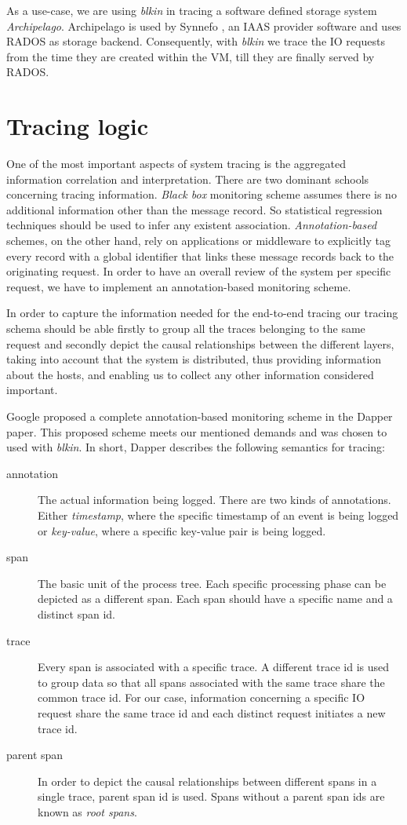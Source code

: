 \documentclass[a4paper,10pt,twocolumn]{article}
\begin{document}
As a use-case, we are using \emph{blkin} in tracing a software defined storage
system \emph{Archipelago}\cite{archip}. Archipelago is used by Synnefo
\cite{synnefo}, an IAAS provider software and uses RADOS\cite{rados} as storage
backend. Consequently, with \emph{blkin} we trace the IO requests from the time
they are created within the VM, till they are finally served by RADOS.

\section{Tracing logic} One of the most important aspects of system tracing is
the aggregated information correlation and interpretation. There are two
dominant schools concerning tracing information. \emph{Black box} monitoring
scheme assumes there is no additional information other than the message record.
So statistical regression techniques should be used to infer any existent
association.  \emph{Annotation-based} schemes, on the other hand, rely on
applications or middleware to explicitly tag every record with a global
identifier that links these message records back to the originating request. In
order to have an overall review of the system per specific request, we have to
implement an annotation-based monitoring scheme.

In order to capture the information needed for the end-to-end tracing our
tracing schema should be able firstly to group all the traces belonging to the
same request and secondly depict the causal relationships between the different
layers, taking into account that the system is distributed, thus providing
information about the hosts, and enabling us to collect any other information
considered important.

Google proposed a complete annotation-based monitoring scheme in the Dapper
paper\cite{dapper}. This proposed scheme meets our mentioned demands and was
chosen to used with \emph{blkin}. In short, Dapper describes the following
semantics for tracing:
\begin{description}
\item[annotation]
The actual information being logged. There are two kinds of annotations. Either
\emph{timestamp}, where the specific timestamp of an event is being logged or 
\emph{key-value}, where a specific key-value pair is being logged.
\item[span]
The basic unit of the process tree. Each specific processing phase can be 
depicted as a different span. Each span should have a specific name and a 
distinct span id.
\item[trace]
Every span is associated with a specific trace. A different trace id is used to
group data so that all spans associated with the same trace share the common
trace id. For our case, information concerning a specific IO request share the
same trace id and each distinct request initiates a new trace id.
\item[parent span] 
In order to depict the causal relationships between different spans in a single
trace, parent span id is used. Spans without a parent span ids are  known as 
\emph{root spans}.
\end{description}
\end{document}
